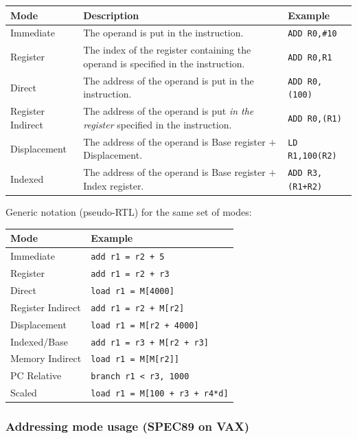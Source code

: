 \begin{center}
\begin{tabular}{@{}p{4cm}p{7cm}l@{}}
\toprule
Mode & Description & Example \\
\midrule
Immediate & The operand is put in the instruction. & \texttt{ADD R0,\#10} \\
Register & The index of the register containing the operand is specified in
the instruction. & \texttt{ADD R0,R1} \\
Direct & The address of the operand is put in the instruction. & \texttt{ADD
R0,(100)} \\
Register Indirect & The address of the operand is put \emph{in the register}
specified in the instruction. & \texttt{ADD R0,(R1)} \\
Displacement & The address of the operand is Base register $+$
Displacement. & \texttt{LD R1,100(R2)} \\
Indexed & The address of the operand is Base register $+$ Index register. &
\texttt{ADD R3,(R1+R2)} \\
\bottomrule
\end{tabular}
\end{center}

Generic notation (pseudo-RTL) for the same set of modes:

\begin{center}
\begin{tabular}{@{}ll@{}}
\toprule
Mode & Example \\
\midrule
Immediate       & \texttt{add r1 = r2 + 5} \\
Register        & \texttt{add r1 = r2 + r3} \\
Direct          & \texttt{load r1 = M[4000]} \\
Register Indirect & \texttt{add r1 = r2 + M[r2]} \\
Displacement    & \texttt{load r1 = M[r2 + 4000]} \\
Indexed/Base    & \texttt{add r1 = r3 + M[r2 + r3]} \\
Memory Indirect & \texttt{load r1 = M[M[r2]]} \\
PC Relative     & \texttt{branch r1 < r3, 1000} \\
Scaled          & \texttt{load r1 = M[100 + r3 + r4*d]} \\
\bottomrule
\end{tabular}
\end{center}

\subsubsection{Addressing mode usage (SPEC89 on VAX)}

